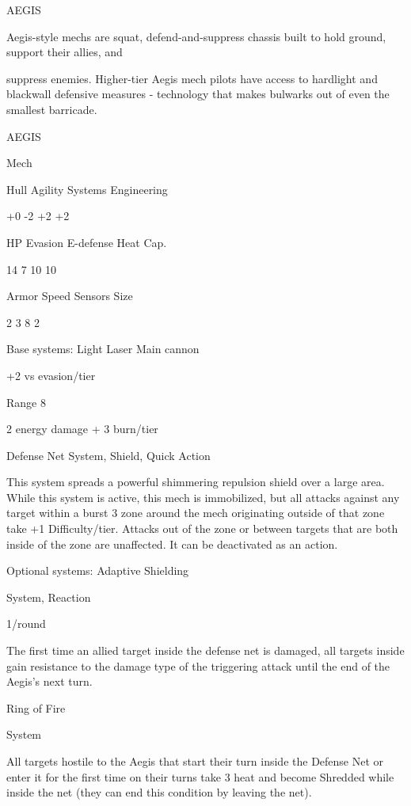                                                  AEGIS  

Aegis-style mechs are squat, defend-and-suppress chassis built to hold ground, support their allies, and  

suppress enemies. Higher-tier Aegis mech pilots have access to hardlight and blackwall defensive  
measures - technology that makes bulwarks out of even the smallest barricade.   

 AEGIS 

 Mech 

 Hull       Agility      Systems       Engineering 

 +0         -2           +2            +2 

 HP         Evasion      E-defense     Heat Cap. 

 14         7            10            10 

 Armor      Speed        Sensors       Size 

 2          3            8             2 

Base systems:  
Light Laser  
Main cannon
 
+2 vs evasion/tier
 
Range 8
 
2 energy damage + 3 burn/tier
 

Defense Net  
System, Shield, Quick Action
 
This system spreads a powerful shimmering repulsion shield over a large area. While this system  
is active, this mech is immobilized, but all attacks against any target within a burst 3 zone around  
the mech originating outside of that zone take +1 Difficulty/tier. Attacks out of the zone or  
between targets that are both inside of the zone are unaffected. It can be deactivated as an  
action.
 

Optional systems:  
Adaptive Shielding
 
System, Reaction
 
1/round
 
The first time an allied target inside the defense net is damaged, all targets inside gain resistance  
to the damage type of the triggering attack until the end of the Aegis’s next turn.
 

Ring of Fire
 

                                                                                                          


System
 
All targets hostile to the Aegis that start their turn inside the Defense Net or enter it for the first  
time on their turns take 3 heat and become Shredded while inside the net (they can end this  
condition by leaving the net).
 

